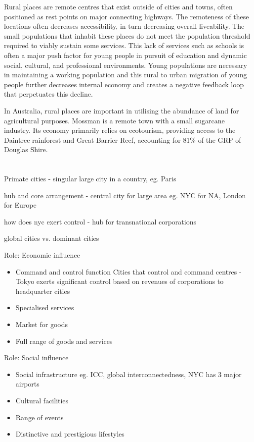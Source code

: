 	Rural places are remote centres that exist outside of cities and towns, often positioned as rest points on major connecting highways. The remoteness of these locations often decreases accessibility, in turn decreasing overall liveability. The small populations that inhabit these places do not meet the population threshold required to viably sustain some services. This lack of services such as schools is often a major push factor for young people in pursuit of education and dynamic social, cultural, and professional environments. Young populations are necessary in maintaining a working population and this rural to urban migration of young people further decreases internal economy and creates a negative feedback loop that perpetuates this decline.

	In Australia, rural places are important in utilising the abundance of land for agricultural purposes. Mossman is a remote town with a small sugarcane industry. Its economy primarily relies on ecotourism, providing access to the Daintree rainforest and Great Barrier Reef, accounting for 81\% of the GRP of Douglas Shire.

\section{}

	Primate cities - singular large city in a country, eg. Paris

	hub and core arrangement - central city for large area eg. NYC for NA, London for Europe

	how does nyc exert control - hub for transnational corporations

	global cities vs. dominant cities



	Role: Economic influence
	\begin{itemize}
		\item Command and control function
			\subitem Cities that control and command centres - Tokyo exerts significant control based on revenues of corporations to headquarter cities
		\item Specialised services
		\item Market for goods
		\item Full range of goods and services
	\end{itemize}

	Role: Social influence
	\begin{itemize}
		\item Social infrastructure eg. ICC, global interconnectedness, NYC has 3 major airports
		\item Cultural facilities
		\item Range of events
		\item Distinctive and prestigious lifestyles
	\end{itemize}
